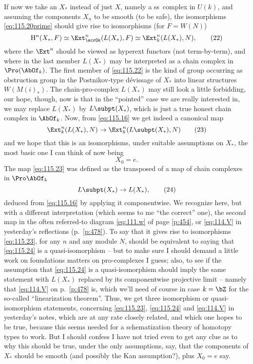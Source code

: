If now we take an $X_*$ instead of just $X$, namely a ss~complex in
$U(k)$, and assuming the components $X_n$ to be smooth (to be safe),
the isomorphisms \eqref{eq:115.20prime} should give rise to
isomorphisms (for $F=W(N)$)
\begin{equation}
  \label{eq:115.22}
  \mathrm H^n(X_*,F) \simeq \Ext_\scrOk^n(L(X_*),F) \simeq
  \Ext_k^n(L(X_*),N),\tag{22} 
\end{equation}
where the $\Ext^n$ should be viewed as hyperext functors (not
term-by-term), and where in the last member $L(X_*)$ may be
interpreted as a chain complex in $\Pro(\AbOf_k)$. The first member of
\eqref{eq:115.22} is the kind of group occurring as obstruction group
in the Postnikov-type dévissage of $X_*$ into linear structures
$W(M(i)_*)$. The chain-pro-complex $L(X_*)$ may still look a little
forbidding, our hope, though, now is that in the ``pointed'' case we
are really interested in, we may replace $L(X_*)$ by $L\subpt(X_*)$,
which is just a true honest chain complex in $\AbOf_k$. Now, from
\eqref{eq:115.16} we get indeed a canonical map
\begin{equation}
  \label{eq:115.23}
  \Ext_k^n(L(X_*),N) \to \Ext_k^n(L\subpt(X_*),N)\tag{23}
\end{equation}
and we hope that this is an isomorphisms, under suitable assumptions
on $X_*$, the most basic one I can think of now being
\[X_0=e.\]
The map \eqref{eq:115.23} was defined as the transposed of a map of
chain complexes in $\Pro \AbOf_k$
\begin{equation}
  \label{eq:115.24}
  L\subpt(X_*)\to L(X_*),\tag{24}
\end{equation}
deduced from \eqref{eq:115.16} by applying it componentwise. We
recognize here, but with a different interpretation (which seems to me
``the correct'' one), the second map in the often referred-to diagram
\eqref{eq:111.w} of page \ref{p:454}, or \eqref{eq:114.V} in
yesterday's reflections (p.~\ref{p:478}). To say that it gives rise to
isomorphisms \eqref{eq:115.23}, for any $n$ and any module $N$, should
be equivalent to saying that \eqref{eq:115.24} is a quasi-isomorphism
-- but to make sure I should demand a little work on foundations
matters on pro-complexes I guess; also, to see if the
assumption that \eqref{eq:115.24} is a quasi-isomorphism should imply
the same statement with $L(X_*)$ replaced by its componentwise
projective limit -- namely that \eqref{eq:114.V} on p.~\ref{p:478} is,
which we'll need of course in case $k=\bZ$ for the so-called
``linearization theorem''. Thus, we get three isomorphism or
quasi-isomorphism statements, concerning \eqref{eq:115.23},
\eqref{eq:115.24} and \eqref{eq:114.V} in yesterday's notes, which are
at any rate closely related, and which one hopes to be true, because
this seems needed for a schematization theory of homotopy types to
work. But I should confess I have not tried even to get any clue as to
why this should be true, under the only assumptions, say, that the
components of $X_*$ should be smooth (and possibly the Kan
assumption?), plus $X_0=e$ say.


